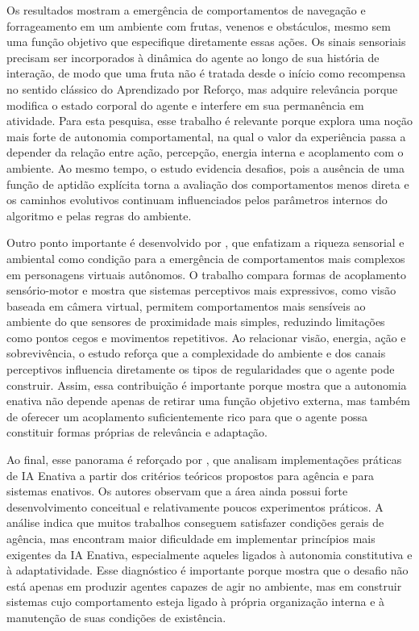 Os resultados mostram a emergência de comportamentos de navegação e forrageamento em um ambiente com frutas, venenos e obstáculos, mesmo sem uma função objetivo que especifique diretamente essas ações. Os sinais sensoriais precisam ser incorporados à dinâmica do agente ao longo de sua história de interação, de modo que uma fruta não é tratada desde o início como recompensa no sentido clássico do Aprendizado por Reforço, mas adquire relevância porque modifica o estado corporal do agente e interfere em sua permanência em atividade. Para esta pesquisa, esse trabalho é relevante porque explora uma noção mais forte de autonomia comportamental, na qual o valor da experiência passa a depender da relação entre ação, percepção, energia interna e acoplamento com o ambiente. Ao mesmo tempo, o estudo evidencia desafios, pois a ausência de uma função de aptidão explícita torna a avaliação dos comportamentos menos direta e os caminhos evolutivos continuam influenciados pelos parâmetros internos do algoritmo e pelas regras do ambiente.

Outro ponto importante é desenvolvido por , que enfatizam a riqueza sensorial e ambiental como condição para a emergência de comportamentos mais complexos em personagens virtuais autônomos. O trabalho compara formas de acoplamento sensório-motor e mostra que sistemas perceptivos mais expressivos, como visão baseada em câmera virtual, permitem comportamentos mais sensíveis ao ambiente do que sensores de proximidade mais simples, reduzindo limitações como pontos cegos e movimentos repetitivos. Ao relacionar visão, energia, ação e sobrevivência, o estudo reforça que a complexidade do ambiente e dos canais perceptivos influencia diretamente os tipos de regularidades que o agente pode construir. Assim, essa contribuição é importante porque mostra que a autonomia enativa não depende apenas de retirar uma função objetivo externa, mas também de oferecer um acoplamento suficientemente rico para que o agente possa constituir formas próprias de relevância e adaptação.

Ao final, esse panorama é reforçado por , que analisam implementações práticas de IA Enativa a partir dos critérios teóricos propostos para agência e para sistemas enativos. Os autores observam que a área ainda possui forte desenvolvimento conceitual e relativamente poucos experimentos práticos. A análise indica que muitos trabalhos conseguem satisfazer condições gerais de agência, mas encontram maior dificuldade em implementar princípios mais exigentes da IA Enativa, especialmente aqueles ligados à autonomia constitutiva e à adaptatividade. Esse diagnóstico é importante porque mostra que o desafio não está apenas em produzir agentes capazes de agir no ambiente, mas em construir sistemas cujo comportamento esteja ligado à própria organização interna e à manutenção de suas condições de existência.

